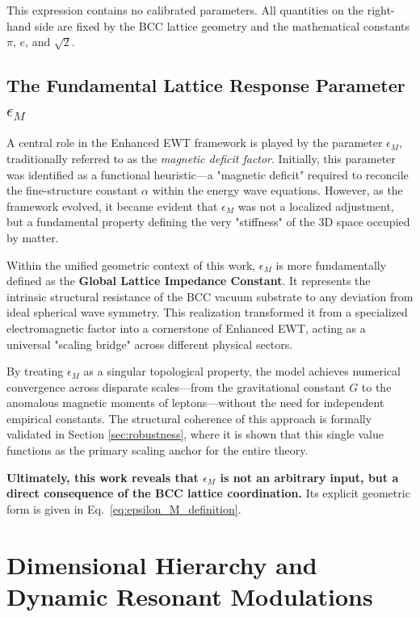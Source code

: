 \documentclass[10pt,a4paper]{article}
\begin{document}
This expression contains no calibrated parameters. All quantities on the right-hand side are fixed by the BCC lattice geometry and the mathematical constants \(\pi\), \(e\), and \(\sqrt{2}\).

\subsection{The Fundamental Lattice Response Parameter \(\epsilon_M\)}

A central role in the Enhanced EWT framework is played by the parameter \(\epsilon_M\), traditionally referred to as the \textit{magnetic deficit factor}. Initially, this parameter was identified as a functional heuristic---a "magnetic deficit" required to reconcile the fine-structure constant \(\alpha\) within the energy wave equations. However, as the framework evolved, it became evident that \(\epsilon_M\) was not a localized adjustment, but a fundamental property defining the very "stiffness" of the 3D space occupied by matter.

Within the unified geometric context of this work, \(\epsilon_M\) is more fundamentally defined as the \textbf{Global Lattice Impedance Constant}. It represents the intrinsic structural resistance of the BCC vacuum substrate to any deviation from ideal spherical wave symmetry. This realization transformed it from a specialized electromagnetic factor into a cornerstone of Enhanced EWT, acting as a universal "scaling bridge" across different physical sectors.

By treating \(\epsilon_M\) as a singular topological property, the model achieves numerical convergence across disparate scales---from the gravitational constant \(G\) to the anomalous magnetic moments of leptons---without the need for independent empirical constants. The structural coherence of this approach is formally validated in Section \ref{sec:robustness}, where it is shown that this single value functions as the primary scaling anchor for the entire theory.

\textbf{Ultimately, this work reveals that \(\epsilon_M\) is not an arbitrary input, but a direct consequence of the BCC lattice coordination.} Its explicit geometric form is given in Eq.~\eqref{eq:epsilon_M_definition}.

\section{Dimensional Hierarchy and Dynamic Resonant Modulations}
\label{sec:dimensional_hierarchy}
\end{document}
